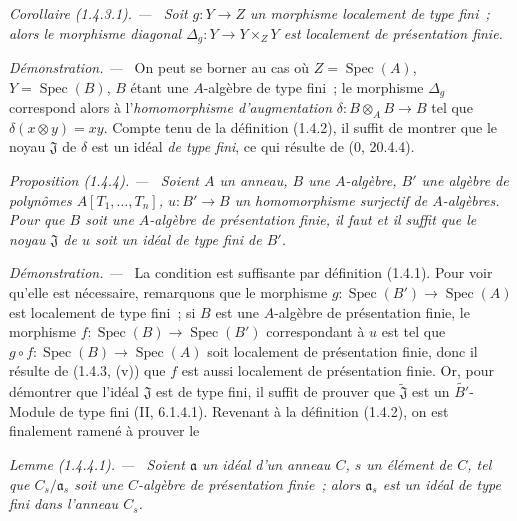 \documentclass[10pt,oneside]{book}
\makeatletter
\newcommand{\setmanualcurrentlabel}[1]{\def\@currentlabel{#1}}
\newcommand{\oldpage}[2][]{%
  \setcounter{footnote}{0}%
  \marginpar{\scriptsize\textbf{#1}~|~#2}\ignorespaces}
\newenvironment{proposition}[1][]{%
  \setmanualcurrentlabel{#1}\par\medskip\noindent\itshape Proposition (#1). ---\ }{\par}
\newenvironment{corollary}[1][]{%
  \setmanualcurrentlabel{#1}\par\medskip\noindent\itshape Corollaire (#1). ---\ }{\par}
\newenvironment{lemma}[1][]{%
  \setmanualcurrentlabel{#1}\par\medskip\noindent\itshape Lemme (#1). ---\ }{\par}
\newenvironment{proof}{%
  \par\medskip\noindent\textit{Démonstration. ---\ }}{\par}
\makeatother
\begin{document}
\begin{corollary}[1.4.3.1]
\label{IV.1.4.3.1-fr}
Soit $g:Y\to Z$ un morphisme localement de type fini~; alors le morphisme
diagonal $\Delta_g:Y\to Y\times_ZY$ est localement de présentation finie.
\end{corollary}

\oldpage[IV-1]{232}

\begin{proof}
On peut se borner au cas où $Z=\operatorname{Spec}(A)$, $Y=\operatorname{Spec}(B)$, $B$ étant une
$A$-algèbre de type fini~; le morphisme $\Delta_g$ correspond alors à
l'\emph{homomorphisme d'augmentation} $\delta:B\otimes_AB\to B$ tel que
$\delta(x\otimes y)=xy$. Compte tenu de la définition (1.4.2), il suffit de
montrer que le noyau $\mathfrak J$ de $\delta$ est un idéal \emph{de type
fini}, ce qui résulte de (0, 20.4.4).
\end{proof}

\begin{proposition}[1.4.4]
\label{IV.1.4.4-fr}
Soient $A$ un anneau, $B$ une $A$-algèbre, $B'$ une algèbre de polynômes
$A[T_1,\ldots,T_n]$, $u:B'\to B$ un homomorphisme surjectif de
$A$-algèbres. Pour que $B$ soit une $A$-algèbre de présentation finie, il faut
et il suffit que le noyau $\mathfrak J$ de $u$ soit un idéal de type fini de
$B'$.
\end{proposition}

\begin{proof}
La condition est suffisante par définition (1.4.1). Pour voir qu'elle est
nécessaire, remarquons que le morphisme $g:\operatorname{Spec}(B')\to\operatorname{Spec}(A)$ est
localement de type fini~; si $B$ est une $A$-algèbre de présentation finie,
le morphisme $f:\operatorname{Spec}(B)\to\operatorname{Spec}(B')$ correspondant à $u$ est tel que
$g\circ f:\operatorname{Spec}(B)\to\operatorname{Spec}(A)$ soit localement de présentation finie, donc il
résulte de (1.4.3, (v)) que $f$ est aussi localement de présentation finie.
Or, pour démontrer que l'idéal $\mathfrak J$ est de type fini, il suffit de
prouver que $\widetilde{\mathfrak J}$ est un $\widetilde{B'}$-Module de type
fini (II, 6.1.4.1). Revenant à la définition (1.4.2), on est finalement ramené
à prouver le
\end{proof}

\begin{lemma}[1.4.4.1]
\label{IV.1.4.4.1-fr}
Soient $\mathfrak a$ un idéal d'un anneau $C$, $s$ un élément de $C$, tel que
$C_s/\mathfrak a_s$ soit une $C$-algèbre de présentation finie~; alors
$\mathfrak a_s$ est un idéal de type fini dans l'anneau $C_s$.
\end{lemma}
\end{document}
